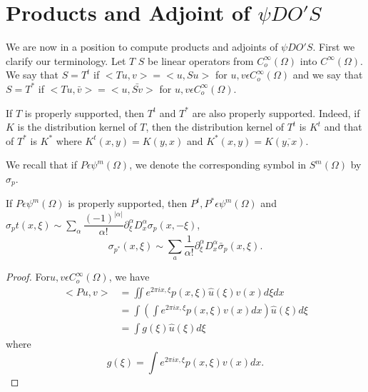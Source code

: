 \section{Products and Adjoint of $\psi DO'S$}\label{chap4:sec6}%

We are now in a position to compute products and adjoints of $\psi
DO'S$. First we clarify our terminology. Let $T$ $S$ be linear
operators from $C^\infty_o (\Omega)$ into $C^\infty (\Omega)$. We
say that $S=T^t$ if $<Tu,v>= <u,Su>$ for $u,v \epsilon C^\infty _o
(\Omega)$ and we say that $S=T^*$ if $<Tu, \bar{v}>=<u, \bar {Sv}>$
for $u,v \epsilon C^ \infty _o (\Omega)$. 

\setcounter{rem}{32}
\begin{rem}\label{chap4:sec6:rem4.33}%
  If $T$ is properly supported, then $T^t$ and $T^*$ are also properly
  supported. Indeed, if $K$ is the distribution kernel of $T$, then the
  distribution kernel of $T^t$ is $K^t$ and that of $T^*$ is $K^*$ where
  $K^t (x,y)=K(y,x)$ and $K^*(x,y)= K (\overline {y,x})$. 
\end{rem}

We recall that if $P \epsilon \psi ^m (\Omega)$, we denote the
corresponding symbol in $S^m (\Omega)$ by $\sigma _p$. 

\setcounter{thm}{33}
\begin{thm}\label{chap4:sec6:thm4.34}%
  If $P \epsilon \psi ^m(\Omega)$ is properly supported, then
  $P^t, P^* \epsilon \psi ^m (\Omega)$ and $\sigma _p t(x, \xi) \sim
  \sum \limits_{\alpha}\dfrac {(-1)^{|\alpha|}}{\alpha !} \partial
  ^\alpha _\xi D^ \alpha _x \sigma _p (x,- \xi)$, 
  $$
  \sigma _{p^*}(x, \xi)\sim \sum_a \frac {1}{\alpha !}\partial ^\alpha _
  \xi D^ \alpha_x \bar{\sigma}_p (x,\xi). 
  $$
\end{thm}

\begin{proof}
  For\pageoriginale $u,v \epsilon C^\infty _o (\Omega)$, we have 
  \begin{align*}
    <Pu,v> &= \iint e^{2 \pi ix,  \xi} p(x, \xi) \hat {u}(\xi)v (x) d \xi dx\\
    &= \int \left(\int e^{2 \pi ix,  \xi} p(x, \xi)v (x) dx\right)
    \hat {u}(\xi)d \xi\\ 
    &=\int g (\xi) \hat{u}(\xi) d \xi
  \end{align*}
  where 
  $$
  g(\xi)= \int e^{2 \pi ix,  \xi} p(x, \xi)v(x)dx.
  $$
\end{proof}

